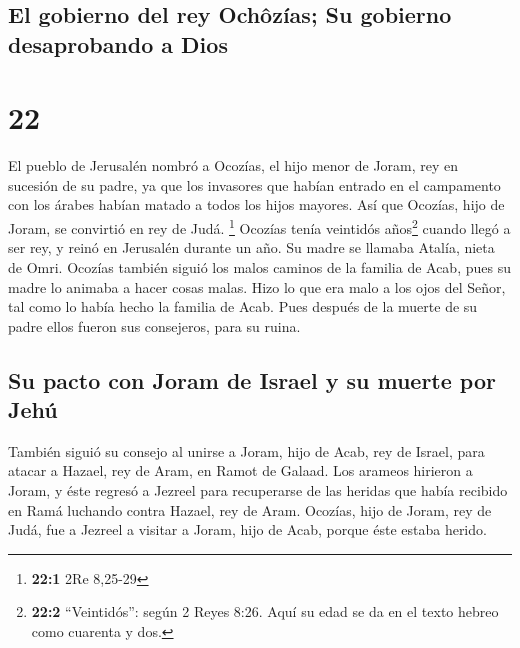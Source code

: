 \hypertarget{el-gobierno-del-rey-ochuxf4zuxedas-su-gobierno-desaprobando-a-dios}{%
\subsection{El gobierno del rey Ochôzías; Su gobierno desaprobando a
Dios}\label{el-gobierno-del-rey-ochuxf4zuxedas-su-gobierno-desaprobando-a-dios}}

\hypertarget{section-21}{%
\section{22}\label{section-21}}

 El pueblo de Jerusalén nombró a Ocozías, el hijo menor de
Joram, rey en sucesión de su padre, ya que los invasores que habían
entrado en el campamento con los árabes habían matado a todos los hijos
mayores. Así que Ocozías, hijo de Joram, se convirtió en rey de Judá.
\footnote{\textbf{22:1} 2Re 8,25-29}  Ocozías tenía
veintidós años\footnote{\textbf{22:2} ``Veintidós'': según 2 Reyes 8:26.
  Aquí su edad se da en el texto hebreo como cuarenta y dos.} cuando
llegó a ser rey, y reinó en Jerusalén durante un año. Su madre se
llamaba Atalía, nieta de Omri.  Ocozías también siguió los
malos caminos de la familia de Acab, pues su madre lo animaba a hacer
cosas malas.  Hizo lo que era malo a los ojos del Señor,
tal como lo había hecho la familia de Acab. Pues después de la muerte de
su padre ellos fueron sus consejeros, para su ruina.

\hypertarget{su-pacto-con-joram-de-israel-y-su-muerte-por-jehuxfa}{%
\subsection{Su pacto con Joram de Israel y su muerte por
Jehú}\label{su-pacto-con-joram-de-israel-y-su-muerte-por-jehuxfa}}

 También siguió su consejo al unirse a Joram, hijo de
Acab, rey de Israel, para atacar a Hazael, rey de Aram, en Ramot de
Galaad. Los arameos hirieron a Joram,  y éste regresó a
Jezreel para recuperarse de las heridas que había recibido en Ramá
luchando contra Hazael, rey de Aram. Ocozías, hijo de Joram, rey de
Judá, fue a Jezreel a visitar a Joram, hijo de Acab, porque éste estaba
herido.

